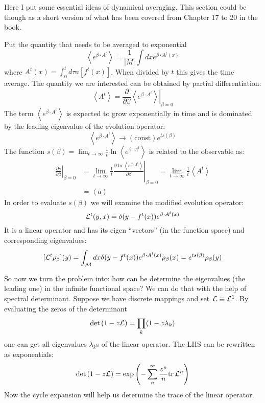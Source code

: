 \begin{description}
Here I put some essential ideas of dynamical averaging. This section could be though as a short version of what has been covered from Chapter 17 to 20 in the book.

Put the quantity that needs to be averaged to exponential
\[
\left\langle e^{\beta\cdot A^{t}}\right\rangle =\frac{1}{\vert M\vert}\int dxe^{\beta\cdot A^{t}(x)}
\]
where $A^{t}(x)=\int_{0}^{t}d\tau a[f^{t}(x)]$. When divided by $t$
this gives the time average. The quantity we are interested can be
obtained by partial differentiation:
\[
\left\langle A^{t}\right\rangle =\frac{\partial}{\partial\beta}\left.\left\langle e^{\beta\cdot A^{t}}\right\rangle \right|_{\beta=0}
\]
The term $\left\langle e^{\beta\cdot A^{t}}\right\rangle $ is expected
to grow exponentially in time and is dominated by the leading eigenvalue
of the evolution operator:
\[
\left\langle e^{\beta\cdot A^{t}}\right\rangle \to(\mathrm{const})e^{ts(\beta)}
\]
The function $s(\beta)=\lim_{t\to\infty}\frac{1}{t}\ln\left\langle e^{\beta\cdot A^{t}}\right\rangle $
is related to the observable as:
\begin{align*}
\left.\frac{\partial s}{\partial\beta}\right|_{\beta=0} & =\lim_{t\to\infty}\frac{1}{t}\left.
\frac{\partial\ln\left\langle e^{\beta\cdot A^{t}}\right\rangle }
     {\partial\beta}\right|_{\beta=0}
   =\lim_{t\to\infty}\frac{1}{t}\left\langle A^{t}\right\rangle \\
 & =\left\langle a\right\rangle
\end{align*}
In order to evaluate $s(\beta)$ we will examine the modified  evolution
operator:
\[
{\cal L}^{t}(y,x)=\delta(y-f^{t}(x))e^{\beta\cdot A^{t}(x)}
\]
It is a linear operator and has its eigen ``vectors'' (in the function
space) and corresponding eigenvalues:
\[
[{\cal L}^{t}\rho_{\beta}](y)=\int_{\mathcal{M}}dx\delta(y-f^{t}(x))e^{\beta\cdot A^{t}(x)}\rho_{\beta}(x)=e^{ts(\beta)}\rho_{\beta}(y)
\]

So now we turn the problem into: how can be determine the eigenvalues
(the leading one) in the infinite functional space? We can do that
with the help of spectral determinant. Suppose we have discrete mappings
and set ${\cal L}\equiv{\cal L}^{1}$. By evaluating the zeros
of the determinant
\[
\mbox{\rm det}\, (1-z{\cal L})=\prod_{k}(1-z \lambda_{k})
\]
one can get all eigenvalues $\lambda_{k}$s of the linear operator.
The LHS can be rewritten as exponentials:
\[
\mbox{\rm det}\, (1-z{\cal L})=\exp\left(-\sum_{n}^{\infty}\frac{z^{n}}{n}\mbox{\rm tr}\,  {\cal L}^{n}\right)
\]
Now the cycle expansion will help us determine the trace of the linear
operator.


\end{description}

